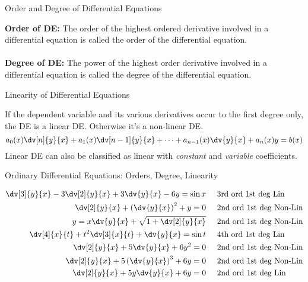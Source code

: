 \begin{definition}{Order and Degree of Differential Equations}
    
    \textbf{Order of DE:} The order of the highest ordered derivative involved in a differential equation is called the order of the differential equation. \\~\\
    \textbf{Degree of DE:} The power of the highest order derivative involved in a differential equation is called the degree of the differential equation.
\end{definition}

\begin{definition}{Linearity of Differential Equations}
    
    If the dependent variable  and its various derivatives occur to the first degree only, the DE is a linear DE. Otherwise it's a non-linear DE. \[
        a_0(x)\dv[n]{y}{x} + a_1(x)\dv[n-1]{y}{x} + \cdots + a_{n-1}(x)\dv{y}{x} + a_n(x)y = b(x)
    \] Linear DE can also be classified as linear with \textit{constant} and \textit{variable} coefficients.
\end{definition}

\begin{example}{Ordinary Differential Equations: Orders, Degree, Linearity}
    
    \begin{align*}
        \dv[3]{y}{x} - 3\dv[2]{y}{x} + 3\dv{y}{x} - 6y = \sin{x} &\text\;\;\;\;\;\text{3rd ord 1st deg Lin} \\
        \dv[2]{y}{x} + \left( \dv{y}{x} \right)^2 + y = 0 &\text\;\;\;\;\;\text{2nd ord 1st deg Non-Lin} \\
        y = x\dv{y}{x} + \sqrt{1 + \dv[2]{y}{x} } &\text\;\;\;\;\;\text{2nd ord 1st deg Non-Lin} \\
        \dv[4]{x}{t} + t^2\dv[3]{x}{t} + \dv{y}{x} = \sin{t} &\text\;\;\;\;\;\text{4th ord 1st deg Lin} \\
        \dv[2]{y}{x} + 5\dv{y}{x} + 6y^2 = 0 &\text\;\;\;\;\;\text{2nd ord 1st deg Non-Lin} \\
        \dv[2]{y}{x} + 5 \left( \dv{y}{x} \right)^3 + 6y = 0 &\text\;\;\;\;\;\text{2nd ord 1st deg Non-Lin} \\
        \dv[2]{y}{x} + 5y\dv{y}{x} + 6y = 0 &\text\;\;\;\;\;\text{2nd ord 1st deg Lin}
    \end{align*}
\end{example}



